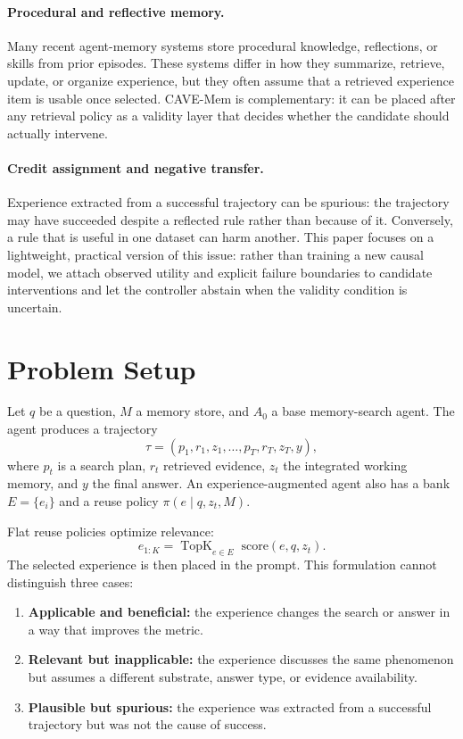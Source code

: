 \documentclass[11pt]{article}
\newcommand{\method}{CAVE-Mem}
\newcommand{\score}{\mathrm{score}}
\begin{document}
\paragraph{Procedural and reflective memory.}
Many recent agent-memory systems store procedural knowledge, reflections, or
skills from prior episodes. These systems differ in how they summarize,
retrieve, update, or organize experience, but they often assume that a retrieved
experience item is usable once selected. \method{} is complementary: it can be
placed after any retrieval policy as a validity layer that decides whether the
candidate should actually intervene.

\paragraph{Credit assignment and negative transfer.}
Experience extracted from a successful trajectory can be spurious: the
trajectory may have succeeded despite a reflected rule rather than because of
it. Conversely, a rule that is useful in one dataset can harm another. This
paper focuses on a lightweight, practical version of this issue: rather than
training a new causal model, we attach observed utility and explicit failure
boundaries to candidate interventions and let the controller abstain when the
validity condition is uncertain.

\section{Problem Setup}

Let $q$ be a question, $M$ a memory store, and $A_0$ a base memory-search agent.
The agent produces a trajectory
\[
\tau = (p_1, r_1, z_1, \ldots, p_T, r_T, z_T, y),
\]
where $p_t$ is a search plan, $r_t$ retrieved evidence, $z_t$ the integrated
working memory, and $y$ the final answer. An experience-augmented agent also
has a bank $E=\{e_i\}$ and a reuse policy $\pi(e\mid q,z_t,M)$.

Flat reuse policies optimize relevance:
\[
e_{1:K} = \operatorname{TopK}_{e\in E}\; \score(e, q, z_t).
\]
The selected experience is then placed in the prompt. This formulation cannot
distinguish three cases:

\begin{enumerate}[leftmargin=*]
  \item \textbf{Applicable and beneficial:} the experience changes the search
  or answer in a way that improves the metric.
  \item \textbf{Relevant but inapplicable:} the experience discusses the same
  phenomenon but assumes a different substrate, answer type, or evidence
  availability.
  \item \textbf{Plausible but spurious:} the experience was extracted from a
  successful trajectory but was not the cause of success.
\end{enumerate}
\end{document}
